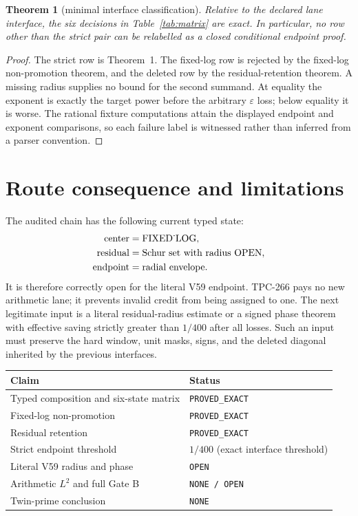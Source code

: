\documentclass[11pt]{article}
\newtheorem{theorem}{Theorem}
\theoremstyle{definition}
\newcommand{\LogType}{\mathrm{FIXED\mathchar`\_LOG}}
\begin{document}
\begin{theorem}[minimal interface classification]
Relative to the declared lane interface, the six decisions in
Table~\ref{tab:matrix} are exact.  In particular, no row other than the
strict pair can be relabelled as a closed conditional endpoint proof.
\end{theorem}

\begin{proof}
The strict row is Theorem~1.  The fixed-log row is rejected by the
fixed-log non-promotion theorem, and the deleted row by the residual-retention
theorem.  A missing radius supplies no bound for the second summand.  At
equality the exponent is exactly the target power before the arbitrary
$\varepsilon$ loss; below equality it is worse.  The rational fixture
computations attain the displayed endpoint and exponent comparisons, so each
failure label is witnessed rather than inferred from a parser convention.
\end{proof}

\section{Route consequence and limitations}

The audited chain has the following current typed state:
\[
 \begin{aligned}
 \text{center}&=\LogType,\\
 \text{residual}&=\text{Schur set with radius OPEN},\\
 \text{endpoint}&=\text{radial envelope}.
 \end{aligned}
\]
It is therefore correctly open for the literal V59 endpoint.  TPC-266 pays no
new arithmetic lane; it prevents invalid credit from being assigned to one.
The next legitimate input is a literal residual-radius estimate or a signed
phase theorem with effective saving strictly greater than $1/400$ after all
losses.  Such an input must preserve the hard window, unit masks, signs, and
the deleted diagonal inherited by the previous interfaces.

\begin{center}
\begin{tabular}{ll}
\toprule
Claim & Status\\
\midrule
Typed composition and six-state matrix & \texttt{PROVED\_EXACT}\\
Fixed-log non-promotion & \texttt{PROVED\_EXACT}\\
Residual retention & \texttt{PROVED\_EXACT}\\
Strict endpoint threshold & $1/400$ (exact interface threshold)\\
Literal V59 radius and phase & \texttt{OPEN}\\
Arithmetic $L^2$ and full Gate B & \texttt{NONE / OPEN}\\
Twin-prime conclusion & \texttt{NONE}\\
\bottomrule
\end{tabular}
\end{center}
\end{document}
